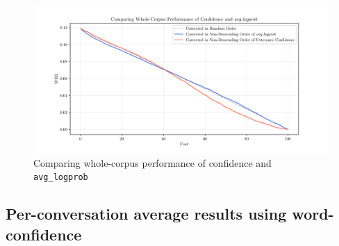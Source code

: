 \begin{figure}[p]
 \caption{Comparing whole-corpus performance of confidence and \texttt{avg\_logprob}}
 \label{fig:corpus-avg-lprob-uttconf}
 \includegraphics[width=\textwidth]{figures/corpus-avg-lprob-uttconf.png}
 \centering
\end{figure}

\clearpage
\subsection{Per-conversation average results using word-confidence}

